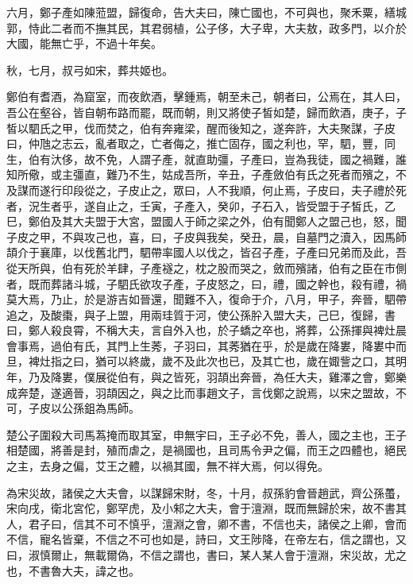 \begin{pinyinscope}
六月，鄭子產如陳蒞盟，歸復命，告大夫曰，陳亡國也，不可與也，聚禾粟，繕城郭，恃此二者而不撫其民，其君弱植，公子侈，大子卑，大夫敖，政多門，以介於大國，能無亡乎，不過十年矣。

秋，七月，叔弓如宋，葬共姬也。

鄭伯有耆酒，為窟室，而夜飲酒，擊鍾焉，朝至未己，朝者曰，公焉在，其人曰，吾公在壑谷，皆自朝布路而罷，既而朝，則又將使子皙如楚，歸而飲酒，庚子，子皙以駟氏之甲，伐而焚之，伯有奔雍梁，醒而後知之，遂奔許，大夫聚謀，子皮曰，仲虺之志云，亂者取之，亡者侮之，推亡固存，國之利也，罕，駟，豐，同生，伯有汏侈，故不免，人謂子產，就直助彊，子產曰，豈為我徒，國之禍難，誰知所儆，或主彊直，難乃不生，姑成吾所，辛丑，子產斂伯有氏之死者而殯之，不及謀而遂行印段從之，子皮止之，眾曰，人不我順，何止焉，子皮曰，夫子禮於死者，況生者乎，遂自止之，壬寅，子產入，癸卯，子石入，皆受盟于子皙氏，乙巳，鄭伯及其大夫盟于大宮，盟國人于師之梁之外，伯有聞鄭人之盟己也，怒，聞子皮之甲，不與攻己也，喜，曰，子皮與我矣，癸丑，晨，自墓門之瀆入，因馬師頡介于襄庫，以伐舊北門，駟帶率國人以伐之，皆召子產，子產曰兄弟而及此，吾從天所與，伯有死於羊肆，子產襚之，枕之股而哭之，斂而殯諸，伯有之臣在市側者，既而葬諸斗城，子駟氏欲攻子產，子皮怒之，曰，禮，國之幹也，殺有禮，禍莫大焉，乃止，於是游吉如晉還，聞難不入，復命于介，八月，甲子，奔晉，駟帶追之，及酸棗，與子上盟，用兩珪質于河，使公孫肸入盟大夫，己巳，復歸，書曰，鄭人殺良霄，不稱大夫，言自外入也，於子蟜之卒也，將葬，公孫揮與裨灶晨會事焉，過伯有氏，其門上生莠，子羽曰，其莠猶在乎，於是歲在降婁，降婁中而旦，裨灶指之曰，猶可以終歲，歲不及此次也已，及其亡也，歲在娵訾之口，其明年，乃及降婁，僕展從伯有，與之皆死，羽頡出奔晉，為任大夫，雞澤之會，鄭樂成奔楚，遂適晉，羽頡因之，與之比而事趙文子，言伐鄭之說焉，以宋之盟故，不可，子皮以公孫鉏為馬師。

楚公子圍殺大司馬蒍掩而取其室，申無宇曰，王子必不免，善人，國之主也，王子相楚國，將善是封，殖而虐之，是禍國也，且司馬令尹之偏，而王之四體也，絕民之主，去身之偏，艾王之體，以禍其國，無不祥大焉，何以得免。

為宋災故，諸侯之大夫會，以謀歸宋財，冬，十月，叔孫豹會晉趙武，齊公孫蠆，宋向戌，衛北宮佗，鄭罕虎，及小邾之大夫，會于澶淵，既而無歸於宋，故不書其人，君子曰，信其不可不慎乎，澶淵之會，卿不書，不信也夫，諸侯之上卿，會而不信，寵名皆棄，不信之不可也如是，詩曰，文王陟降，在帝左右，信之謂也，又曰，淑慎爾止，無載爾偽，不信之謂也，書曰，某人某人會于澶淵，宋災故，尤之也，不書魯大夫，諱之也。


\end{pinyinscope}
